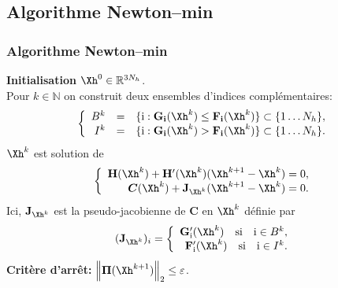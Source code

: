 \documentclass{beamer}
\begin{document}
\subsection{Algorithme Newton--min}
\begin{frame}
\frametitle{Algorithme Newton--min}
\textbf{Initialisation} ${\Xh^0} \in {\mathbb{R}}^{3N_h}$.\\
Pour $k\in\mathbb{N}$ on construit deux ensembles d'indices complémentaires: \begin{equation}
\left\lbrace\begin{array}{rclrl}
B^k &=&\{\mathrm{i}:{\bf G_i}(\Xh^k)\leq {\bf F_i}(\Xh^k)\} \subset \{1 \ldots N_h \},\\
I^k &=&\{\mathrm{i}:{\bf G_i}({\Xh^k})>{\bf F_i}({\Xh^k})\}\subset\{1\ldots
N_h\}.
\end{array}
\right.
\end{equation}
${\Xh^k}$ est solution de
\begin{equation}
\left\lbrace\begin{array}{rclrl}
{\bf H}(\Xh^k)+{\bf H'}(\Xh^k)(\Xh^{k+1}-\Xh^k)=0,\\
{\bm C}(\Xh^k)+{\bf J}_{\Xh^k}(\Xh^{k+1}-\Xh^k)=0.
\end{array}
\right.
\end{equation}
Ici, ${\bf J}_{\Xh^k}$ est la pseudo-jacobienne de ${\bm C}$ en $\Xh^k$ définie par
\begin{equation}
({\bf J}_{\Xh^k})_i=
\left\lbrace\begin{array}{rclrl}
{\bf G}_{\mathrm{i}}'(\Xh^k)\quad \mbox{si} \quad \mathrm{i}\in B^k,\\
{\bf F}_{\mathrm{i}}'(\Xh^k) \quad \mbox{si} \quad \mathrm{i}\in I^k.
\end{array}
\right.
\end{equation}
\textbf{Critère d'arrêt:} $\left\|{\bm \Pi}(\Xh^{k+1})\right\|_2\leq \varepsilon$. %
\end{frame}
%
\end{document}
